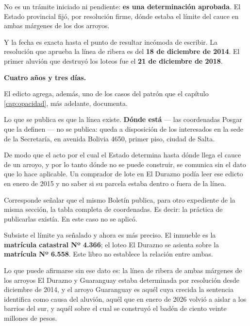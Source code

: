 \begin{cautela}
No es un trámite iniciado ni pendiente: \textbf{es una determinación aprobada}. El Estado provincial fijó, por resolución firme, dónde estaba el límite del cauce en ambas márgenes de los dos arroyos.
\end{cautela}

Y la fecha es exacta hasta el punto de resultar incómoda de escribir. La resolución que aprueba la línea de ribera es del \textbf{18 de diciembre de 2014}. El primer aluvión que destruyó los loteos fue el \textbf{21 de diciembre de 2018}.

\textbf{Cuatro años y tres días.}

\begin{cautela}
El edicto agrega, además, uno de los casos del patrón que el capítulo \ref{cap:opacidad}, más adelante, documenta.

Lo que se publica es que la línea existe. \textbf{Dónde está} --- las coordenadas Posgar que la definen --- no se publica: queda a disposición de los interesados en la sede de la Secretaría, en avenida Bolivia 4650, primer piso, ciudad de Salta.

De modo que el acto por el cual el Estado determina hasta dónde llega el cauce de un arroyo, y por lo tanto dónde no se puede construir, se comunica sin el dato que lo hace aplicable. Un comprador de lote en El Durazno podía leer ese edicto en enero de 2015 y no saber si su parcela estaba dentro o fuera de la línea.

Corresponde señalar que el mismo Boletín publica, para otro expediente de la misma sección, la tabla completa de coordenadas. Es decir: la práctica de publicarlas existía. En este caso no se aplicó.
\end{cautela}

\begin{cautela}
Subsiste el límite ya señalado y ahora es más preciso. El inmueble es la \textbf{matrícula catastral Nº 4.366}; el loteo El Durazno se asienta sobre la \textbf{matrícula Nº 6.558}. Este libro no establece la relación entre ambas.

Lo que puede afirmarse sin ese dato es: la línea de ribera de ambas márgenes de los arroyos El Durazno y Guaranguay estaba determinada por resolución desde diciembre de 2014, y el arroyo Guaranguay es aquél cuya crecida la sentencia identifica como causa del aluvión, aquél que en enero de 2026 volvió a aislar a los barrios del sur, y aquél sobre el cual se construyó el badén de ciento veinte millones de pesos.
\end{cautela}

